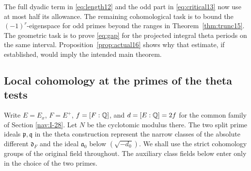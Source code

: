 \documentclass[a4paper,11pt]{article}
\theoremstyle{definition}
\theoremstyle{remark}
\numberwithin{equation}{section}
\begin{document}
The full dyadic term in \eqref{eq:length12} and the odd part in \eqref{eq:critical13} now use at most half its allowance. The remaining cohomological task is to bound the \((-1)^r\)-eigenspace for odd primes beyond the ranges in Theorem~\ref{thm:trunc15}. The geometric task is to prove \eqref{eq:gap} for the projected integral theta periods on the same interval. Proposition~\ref{prop:actual16} shows why that estimate, if established, would imply the intended main theorem.

\subsection{Local cohomology at the primes of the theta tests}\label{nav:II-21}
\label{sec:relax183}

Write \(E=E_x\), \(F=E^+\), \(f=[F:\mathbb Q]\), and
\(d=[E:\mathbb Q]=2f\) for the common family of Section \ref{nav:I-28}. Let \(N\) be the cyclotomic modulus there.
The two split prime ideals \(\mathfrak p,\mathfrak q\)
in the theta construction represent the narrow classes of
the absolute different \(\mathfrak d_F\) and the ideal
\(\mathfrak a_0\) below \((\sqrt{-d_0})\).
We shall use the strict cohomology groups of the original
field throughout. The auxiliary class fields below enter
only in the choice of the two primes.
\end{document}
